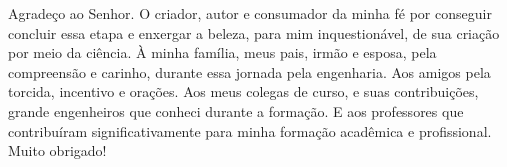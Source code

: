 \begin{agradecimentos}

Agradeço ao Senhor. O criador, autor e consumador da minha fé por conseguir concluir essa etapa e enxergar a beleza, para mim inquestionável, de sua criação por meio da ciência. À minha família, meus pais, irmão e esposa, pela compreensão e carinho, durante essa jornada pela engenharia. Aos amigos pela torcida, incentivo e orações. Aos meus colegas de curso, e suas contribuições, grande engenheiros que conheci durante a formação. E aos professores que contribuíram significativamente para minha formação acadêmica e profissional. Muito obrigado!

\end{agradecimentos}